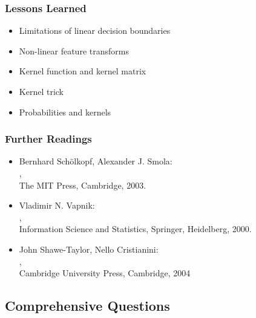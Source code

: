 \begin{frame}
	\frametitle{Lessons Learned}

	\begin{itemize}
		\item Limitations of linear decision boundaries \\[.5cm]
		\item Non-linear feature transforms \\[.5cm]
		\item Kernel function and kernel matrix \\[.5cm]
		\item Kernel trick \\[.5cm]
		\item Probabilities and kernels
	\end{itemize}
\end{frame}




\begin{frame}
	\frametitle{Further Readings}

	\begin{itemize}
		\item Bernhard Sch{\"o}lkopf, Alexander J. Smola: \\
		      , \\
		      The MIT Press, Cambridge, 2003. \\[.25cm]
		\item Vladimir N. Vapnik: \\
		      , \\
		      Information Science and Statistics, Springer, Heidelberg, 2000. \\[.25cm]
		\item John Shawe-Taylor, Nello Cristianini: \\
		      \point \href{https://www.google.de/search?hl=de&q=Kernel\%20Methods\%20for\%20Pattern\%20Analysis+pdf}
		      {}, \\
		      Cambridge University Press, Cambridge, 2004
	\end{itemize}
\end{frame}


\subsection{Comprehensive Questions}

